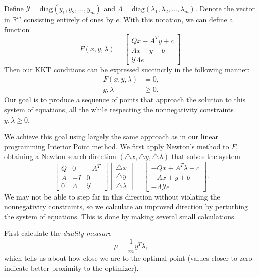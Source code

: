 Define $\mathcal{Y} = \text{diag}(y_1,y_2,\ldots,y_m)$ and $\Lambda = \text{diag}(\lambda_1,\lambda_2,\ldots,\lambda_m)$.
Denote the vector in $\mathbb{R}^m$ consisting entirely of ones by $e$. With this notation, we can define a function
\[
F(x,y,\lambda) =
\begin{bmatrix}
Qx-A^Ty + c\\
Ax-y-b\\
\mathcal{Y}\Lambda e
\end{bmatrix}.
\]
Then our KKT conditions can be expressed succinctly in the following manner:
\begin{align*}
F(x,y,\lambda) &= 0,\\
y,\lambda &\geq 0.
\end{align*}
Our goal is to produce a sequence of points that approach the solution to this system of equations, all the while
respecting the nonnegativity constraints $y,\lambda \geq 0$.

We achieve this goal using largely the same approach as in our linear programming Interior Point method.
We first apply Newton's method to $F$, obtaining a Newton search direction $(\triangle x, \triangle y, \triangle \lambda)$
that solves the system
\begin{equation}
\begin{bmatrix}
Q & 0 & -A^T\\
A & -I & 0\\
0 & \Lambda & \mathcal{Y}
\end{bmatrix}
\begin{bmatrix}
\triangle x\\
\triangle y\\
\triangle \lambda
\end{bmatrix}
=
\begin{bmatrix}
-Qx + A^T\lambda - c\\
-Ax + y + b\\
-\Lambda\mathcal{Y}e
\end{bmatrix}.
\label{eq:affine}
\end{equation}
We may not be able to step far in this direction without violating the nonnegativity constraints, so we calculate
an improved direction by perturbing the system of equations. This is done by making several small calculations.

First calculate the \emph{duality measure}
\[
\mu = \frac{1}{m}y^T\lambda,
\]
which tells us about how close we are to the optimal point (values closer to zero indicate better proximity to the optimizer).

